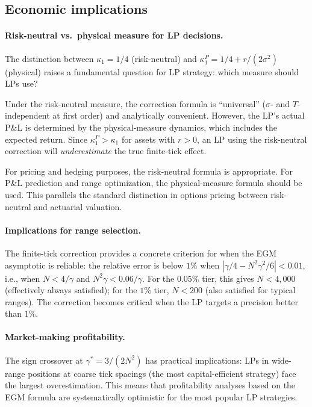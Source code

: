 \documentclass[11pt]{article}
\theoremstyle{definition}
\theoremstyle{remark}
\begin{document}
\subsection{Economic implications}

\paragraph{Risk-neutral vs.\ physical measure for LP decisions.}
The distinction between $\kappa_1 = 1/4$ (risk-neutral) and
$\kappa_1^P = 1/4 + r/(2\sigma^2)$ (physical) raises a fundamental
question for LP strategy: which measure should LPs use?

Under the risk-neutral measure, the correction formula is
``universal'' ($\sigma$- and $T$-independent at first order) and
analytically convenient. However, the LP's actual P\&L is determined
by the physical-measure dynamics, which includes the expected return.
Since $\kappa_1^P > \kappa_1$ for assets with $r > 0$, an LP using
the risk-neutral correction will \emph{underestimate} the true
finite-tick effect.

For pricing and hedging purposes, the risk-neutral formula is
appropriate. For P\&L prediction and range optimization, the
physical-measure formula should be used. This parallels the standard
distinction in options pricing between risk-neutral and actuarial
valuation.

\paragraph{Implications for range selection.}
The finite-tick correction provides a concrete criterion for when the
EGM asymptotic is reliable: the relative error is below $1\%$ when
$|\gamma/4 - N^2\gamma^2/6| < 0.01$, i.e., when $N < 4/\gamma$ and
$N^2\gamma < 0.06/\gamma$. For the $0.05\%$ tier, this gives
$N < 4{,}000$ (effectively always satisfied); for the $1\%$ tier,
$N < 200$ (also satisfied for typical ranges). The correction becomes
critical when the LP targets a precision better than $1\%$.

\paragraph{Market-making profitability.}
The sign crossover at $\gamma^* = 3/(2N^2)$ has practical
implications: LPs in wide-range positions at coarse tick spacings
(the most capital-efficient strategy) face the largest
overestimation. This means that profitability analyses based on the
EGM formula are systematically optimistic for the most popular LP
strategies.
\end{document}
